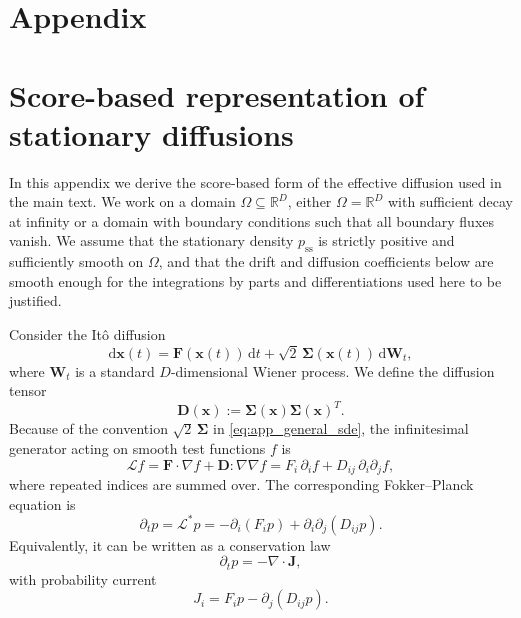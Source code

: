 \documentclass[11pt,twoside,fleqn]{article}
\renewcommand{\d}{\mathrm{d}}
\begin{document}
\section*{Appendix}
\section{Score-based representation of stationary diffusions}
\label{app:mobility_representation}

In this appendix we derive the score-based form of the effective diffusion used in the main text. We work on a domain $\Omega\subseteq\mathbb{R}^D$, either $\Omega=\mathbb{R}^D$ with sufficient decay at infinity or a domain with boundary conditions such that all boundary fluxes vanish. We assume that the stationary density $p_{\mathrm{ss}}$ is strictly positive and sufficiently smooth on $\Omega$, and that the drift and diffusion coefficients below are smooth enough for the integrations by parts and differentiations used here to be justified.

Consider the It\^o diffusion
\begin{equation}
    \d \bm{x}(t)
    =
    \bm{F}(\bm{x}(t))\,\d t
    +
    \sqrt{2}\,\bm{\Sigma}(\bm{x}(t))\,\d \bm{W}_t ,
    \label{eq:app_general_sde}
\end{equation}
where $\bm{W}_t$ is a standard $D$-dimensional Wiener process. We define the diffusion tensor
\begin{equation}
    \bm{D}(\bm{x})
    :=
    \bm{\Sigma}(\bm{x})\bm{\Sigma}(\bm{x})^T .
    \label{eq:app_diffusion_tensor}
\end{equation}
Because of the convention $\sqrt{2}\,\bm{\Sigma}$ in \eqref{eq:app_general_sde}, the infinitesimal generator acting on smooth test functions $f$ is
\begin{equation}
    \mathcal{L}f
    =
    \bm{F}\cdot\nabla f
    +
    \bm{D}:\nabla\nabla f
    =
    F_i\,\partial_i f
    +
    D_{ij}\,\partial_i\partial_j f ,
    \label{eq:app_generator}
\end{equation}
where repeated indices are summed over. The corresponding Fokker--Planck equation is
\begin{equation}
    \partial_t p
    =
    \mathcal{L}^*p
    =
    -\partial_i(F_i p)
    +
    \partial_i\partial_j(D_{ij}p).
    \label{eq:app_fokker_planck}
\end{equation}
Equivalently, it can be written as a conservation law
\begin{equation}
    \partial_t p
    =
    -\nabla\cdot\bm{J},
    \label{eq:app_conservation_law}
\end{equation}
with probability current
\begin{equation}
    J_i
    =
    F_i p
    -
    \partial_j(D_{ij}p).
    \label{eq:app_probability_current}
\end{equation}
\end{document}
